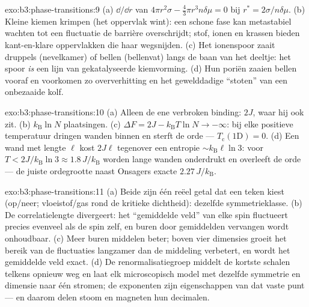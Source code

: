 \begin{solution}{exo:b3:phase-transitions:9}
(a) $\dd/\dd r$ van $4\pi r^2\sigma - \tfrac43\pi r^3n\delta\mu = 0$
bij $r^* = 2\sigma/n\delta\mu$. (b) Kleine kiemen krimpen (het oppervlak
wint): een schone fase kan metastabiel wachten tot een fluctuatie
de barrière overschrijdt; stof, ionen en krassen bieden kant-en-klare
oppervlakken die haar wegsnijden. (c) Het ionenspoor zaait druppels (nevel\-kamer)
of bellen (bellenvat) langs de baan van het deeltje:
het spoor \emph{is} een lijn van gekatalyseerde kiemvorming. (d) Hun
poriën zaaien bellen vooraf en voorkomen zo oververhitting en het gewelddadige
``stoten'' van een onbezaaide kolf.
\end{solution}

\begin{solution}{exo:b3:phase-transitions:10}
(a) Alleen de ene verbroken binding: $2J$, waar hij ook zit. (b)
$k_{\text{B}}\ln N$ plaatsingen. (c) $\Delta F = 2J -
k_{\text{B}}T\ln N \to -\infty$: bij elke positieve temperatuur
dringen wanden binnen en sterft de orde --- $T_{\text{c}}(1\text{D}) = 0$. (d)
Een wand met lengte $\ell$ kost $2J\ell$ tegenover een entropie
$\sim k_{\text{B}}\ell\ln3$: voor $T < 2J/k_{\text{B}}\ln3 \approx
1.8\,J/k_{\text{B}}$ worden lange wanden onderdrukt en overleeft de orde
--- de juiste ordegrootte naast Onsagers exacte
$2.27\,J/k_{\text{B}}$.
\end{solution}

\begin{solution}{exo:b3:phase-transitions:11}
(a) Beide  zijn één reëel getal dat een teken kiest
(op/neer; vloeistof/gas rond de kritieke dichtheid): dezelfde
symmetrieklasse. (b) De correlatielengte divergeert: het ``gemiddelde
veld'' van elke spin fluctueert precies evenveel als de spin zelf, en
buren door gemiddelden vervangen wordt onhoudbaar. (c) Meer
buren middelen beter; boven vier dimensies groeit het bereik van de
fluctuaties langzamer dan de middeling verbetert, en wordt het gemiddelde veld
exact. (d) De renormalisatiegroep middelt de kortste schalen
telkens opnieuw weg en laat elk microscopisch model met dezelfde
symmetrie en dimensie naar één  stromen; de exponenten zijn
eigenschappen van dat vaste punt --- en daarom delen stoom en magneten
hun decimalen.
\end{solution}

